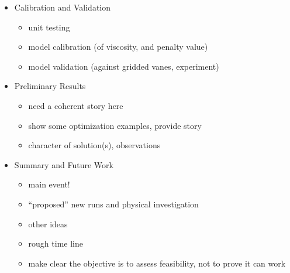 \documentclass{article}
\begin{document}
\begin{itemize}
 \item Calibration and Validation
       \begin{itemize}
	\item unit testing 
	\item model calibration (of viscosity, and penalty value)
	\item model validation (against gridded vanes, experiment)
       \end{itemize}

 \item Preliminary Results
       \begin{itemize}
        \item need a coherent story here
        \item show some optimization examples, provide story
	\item character of solution(s), observations
       \end{itemize}
 \item Summary and Future Work
       \begin{itemize}
        \item main event!
	\item ``proposed'' new runs and physical investigation
	\item other ideas
	\item rough time line
	\item make clear the objective is to assess feasibility, not to prove it can work
       \end{itemize}

\end{itemize}
\end{document}
